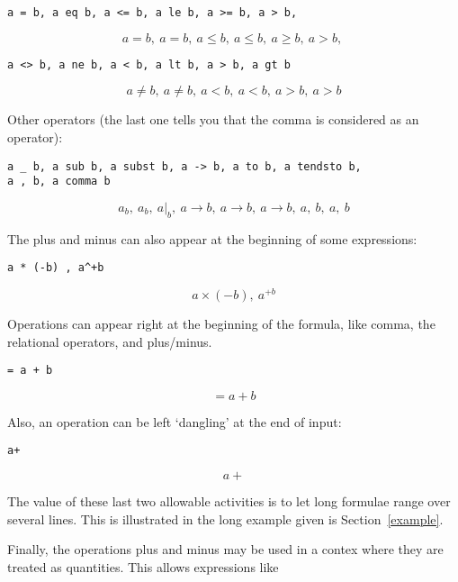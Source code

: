 \documentclass[12pt]{article}
\begin{document}
\begin{verbatim}
a = b, a eq b, a <= b, a le b, a >= b, a > b,
\end{verbatim}

\[
a = b , \ a = b , \ a \le b , \ a \le b , \ a \ge b , \ a > b , \ 
\]

\begin{verbatim}
a <> b, a ne b, a < b, a lt b, a > b, a gt b
\end{verbatim}

\[
a \ne b , \ a \ne b , \ a < b , \ a < b , \ a > b , \ a > b
\]

\noindent Other operators (the last one tells you that the comma is considered
as an operator):

\begin{verbatim}
a _ b, a sub b, a subst b, a -> b, a to b, a tendsto b, 
a , b, a comma b
\end{verbatim}

\[
{a} _ {b} , \ {a} _ {b} , \ \left.a\right|_{b} , \ a \to b , \ a \to b , \ a \to b , \ a , \ b , \ a , \ b
\]

\noindent The plus and minus can also appear at the beginning of some expressions:

\begin{verbatim}
a * (-b) , a^+b
\end{verbatim}

\[
a \times \left(  - b \right) , \ {a} ^ { + b}
\]

\noindent Operations can appear right at the beginning of the formula, like
comma, the relational operators, and plus/minus.

\begin{verbatim}
= a + b
\end{verbatim}

\[
 = a + b
\]

\noindent Also, an operation can be left `dangling' at the end of input:

\begin{verbatim}
a+
\end{verbatim}

\[
a + 
\]

\noindent The value of these last two allowable activities is to let long formulae
range over several lines.  This is illustrated in the long example given
is Section~\ref{example}.

\noindent \indent
Finally, the operations plus and minus may be used in a contex where they
are treated as quantities.  This allows expressions like
\end{document}
